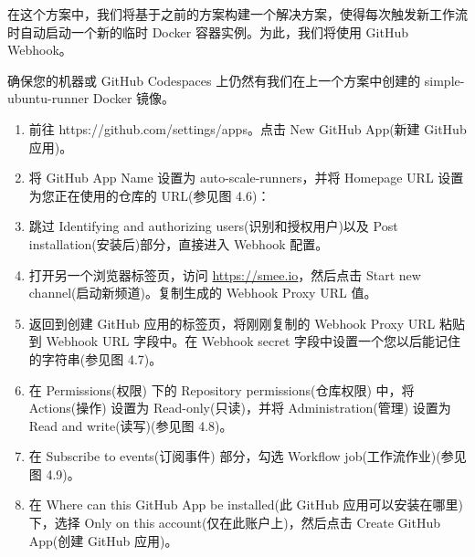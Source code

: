 在这个方案中，我们将基于之前的方案构建一个解决方案，使得每次触发新工作流时自动启动一个新的临时 Docker 容器实例。为此，我们将使用 GitHub Webhook。


确保您的机器或 GitHub Codespaces 上仍然有我们在上一个方案中创建的 simple-ubuntu-runner Docker 镜像。


\begin{enumerate}
\item 
前往 https://github.com/settings/apps。点击 New GitHub App(新建 GitHub 应用)。

\item 
将 GitHub App Name 设置为 auto-scale-runners，并将 Homepage URL 设置为您正在使用的仓库的 URL(参见图 4.6)：


\item 
跳过 Identifying and authorizing users(识别和授权用户)以及 Post installation(安装后)部分，直接进入 Webhook 配置。

\item 
打开另一个浏览器标签页，访问 \url{https://smee.io}，然后点击 Start new channel(启动新频道)。复制生成的 Webhook Proxy URL 值。

\item 
返回到创建 GitHub 应用的标签页，将刚刚复制的 Webhook Proxy URL 粘贴到 Webhook URL 字段中。在 Webhook secret 字段中设置一个您以后能记住的字符串(参见图 4.7)。


\item 
在 Permissions(权限) 下的 Repository permissions(仓库权限) 中，将 Actions(操作) 设置为 Read-only(只读)，并将 Administration(管理) 设置为 Read and write(读写)(参见图 4.8)。


\item 
在 Subscribe to events(订阅事件) 部分，勾选 Workflow job(工作流作业)(参见图 4.9)。


\item 
在 Where can this GitHub App be installed(此 GitHub 应用可以安装在哪里) 下，选择 Only on this account(仅在此账户上)，然后点击 Create GitHub App(创建 GitHub 应用)。


\end{enumerate}
